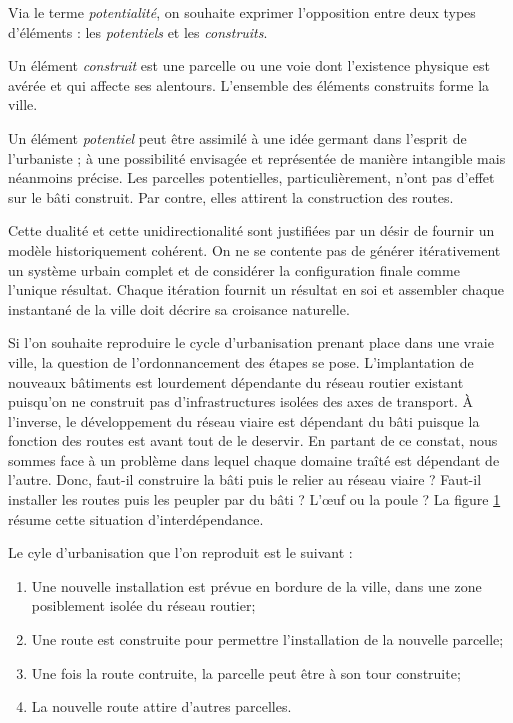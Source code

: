 \documentclass[12pt]{article}
\begin{document}
Via le terme \textit{potentialité}, on souhaite exprimer l'opposition
entre deux types d'éléments : les \textit{potentiels} et les
\textit{construits}.

Un élément \textit{construit} est une parcelle ou une voie dont
l'existence physique est avérée et qui affecte ses
alentours. L'ensemble des éléments construits forme la ville.

Un élément \textit{potentiel} peut être assimilé à une idée germant
dans l'esprit de l'urbaniste ; à une possibilité envisagée et
représentée de manière intangible mais néanmoins précise. Les
parcelles potentielles, particulièrement, n'ont pas d'effet sur le
bâti construit. Par contre, elles attirent la construction des routes.

Cette dualité et cette unidirectionalité sont justifiées par un désir
de fournir un modèle historiquement cohérent. On ne se contente pas de
générer itérativement un système urbain complet et de considérer la
configuration finale comme l'unique résultat. Chaque itération fournit
un résultat en soi et assembler chaque instantané de la ville doit
décrire sa croisance naturelle.

Si l'on souhaite reproduire le cycle d'urbanisation prenant place dans
une vraie ville, la question de l'ordonnancement des étapes se
pose. L'implantation de nouveaux bâtiments est lourdement dépendante
du réseau routier existant puisqu'on ne construit pas
d'infrastructures isolées des axes de transport. \`A l'inverse, le
développement du réseau viaire est dépendant du bâti puisque la
fonction des routes est avant tout de le deservir. En partant de ce
constat, nous sommes face à un problème dans lequel chaque domaine
traîté est dépendant de l'autre. Donc, faut-il construire la bâti puis
le relier au réseau viaire ? Faut-il installer les routes puis les
peupler par du bâti ?  L'\oe uf ou la poule ? La figure
\ref{fig:bati-viaire} résume cette situation d'interdépendance.

\begin{figure}[H]
  \centering
  
  \caption{}
  \label{fig:bati-viaire}
\end{figure}

Le cyle d'urbanisation que l'on reproduit est le suivant :

\begin{enumerate}
\item{Une nouvelle installation est prévue en bordure de la ville,
  dans une zone posiblement isolée du réseau routier;}
\item{Une route est construite pour permettre l'installation de la
  nouvelle parcelle;}
\item{Une fois la route contruite, la parcelle peut être à son tour construite;}
\item{La nouvelle route attire d'autres parcelles.}
\end{enumerate}
\end{document}
